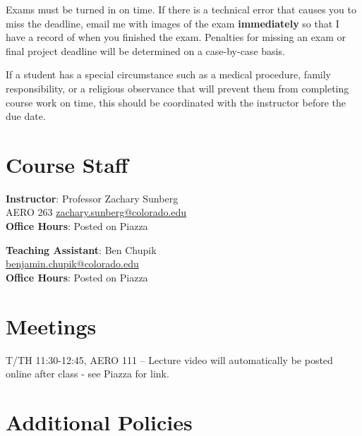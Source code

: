 \documentclass[9pt]{article}
\begin{document}
Exams must be turned in on time. If there is a technical error that causes you to miss the deadline, email me with images of the exam \textbf{immediately} so that I have a record of when you finished the exam. Penalties for missing an exam or final project deadline will be determined on a case-by-case basis.

If a student has a special circumstance such as a medical procedure, family responsibility, or a religious observance that will prevent them from completing course work on time, this should be coordinated with the instructor before the due date.

\section*{Course Staff}

\begin{multicols}{2}
    \begin{minipage}{\columnwidth}
        \textbf{Instructor}: Professor Zachary Sunberg\\
        AERO 263 \href{mailto://zachary.sunberg@colorado.edu}{zachary.sunberg@colorado.edu}\\
        \textbf{Office Hours}: Posted on Piazza
    \end{minipage}

    \begin{minipage}{\columnwidth}
        \textbf{Teaching Assistant}: Ben Chupik\\
        \href{mailto://benjamin.chupik@colorado.edu}{benjamin.chupik@colorado.edu}\\
        \textbf{Office Hours}: Posted on Piazza
    \end{minipage}
\end{multicols}

\section*{Meetings}

T/TH 11:30-12:45, AERO 111 -- Lecture video will automatically be posted online after class - see Piazza for link.

\section*{Additional Policies}

{\small
    
}
\end{document}
